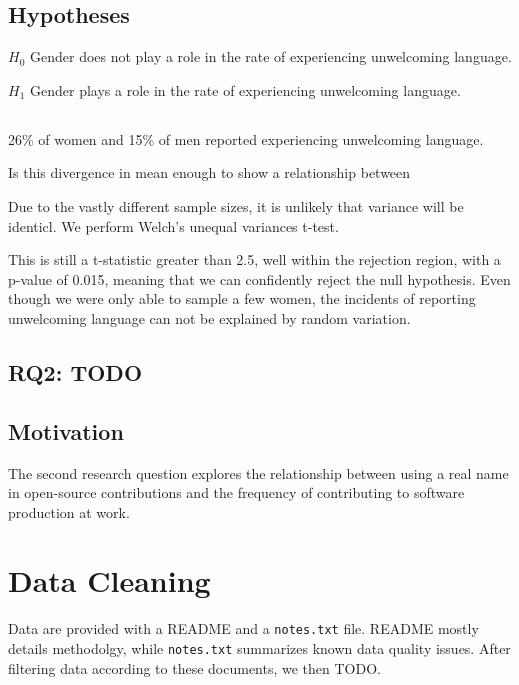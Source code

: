 \documentclass[journal,12pt,onecolumn,]{IEEEtran}
\begin{document}
\subsection{Hypotheses}

$H_0$ Gender does not play a role in the rate of experiencing unwelcoming language.

$H_1$ Gender plays a role in the rate of experiencing unwelcoming language.
\subsection{}

26\% of women and 15\% of men reported experiencing unwelcoming language.

Is this divergence in mean enough to show a relationship between

Due to the vastly different sample sizes, it is unlikely that variance will be identicl.
We perform Welch's unequal variances t-test.

This is still a t-statistic greater than 2.5, well within the rejection region, with a p-value of 0.015, meaning that we can confidently reject the null hypothesis.
Even though we were only able to sample a few women, the incidents of reporting unwelcoming language can not be explained by random variation.

\begin{figure}
    \centering
    
\end{figure}


\subsection{RQ2: TODO}

\subsection{Motivation}

The second research question explores the relationship between using a real name in open-source contributions and the frequency of contributing to software production at work.

\section{Data Cleaning}

Data are provided with a \textsc{README} and a \texttt{notes.txt} file.
\textsc{README} mostly details methodolgy, while \texttt{notes.txt} summarizes known data quality issues.
After filtering data according to these documents, we then TODO.
\end{document}
